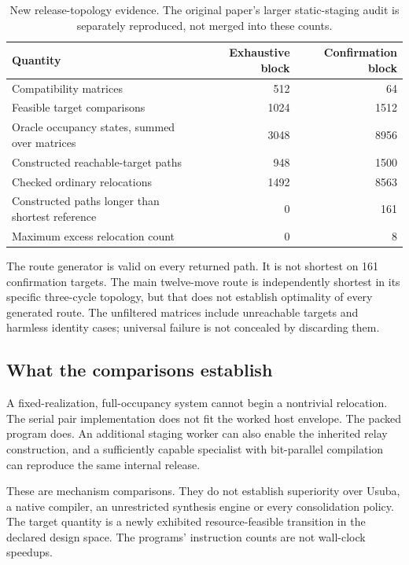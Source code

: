 \documentclass[11pt,letterpaper]{article}
\theoremstyle{definition}\newtheorem{definition}[theorem]{Definition}
\theoremstyle{remark}\newtheorem{remark}[theorem]{Remark}
\begin{document}
\begin{table}[htbp]\centering\small
\caption{New release-topology evidence. The original paper's larger static-staging audit is separately reproduced, not merged into these counts.}
\begin{tabularx}{\linewidth}{@{}Yrr@{}}\toprule
Quantity & Exhaustive block & Confirmation block\\\midrule
Compatibility matrices & 512 & 64\\
Feasible target comparisons & 1024 & 1512\\
Oracle occupancy states, summed over matrices & 3048 & 8956\\
Constructed reachable-target paths & 948 & 1500\\
Checked ordinary relocations & 1492 & 8563\\
Constructed paths longer than shortest reference & 0 & 161\\
Maximum excess relocation count & 0 & 8\\\bottomrule
\end{tabularx}
\label{tab:topology}
\end{table}

The route generator is valid on every returned path. It is not shortest on 161 confirmation targets. The main twelve-move route is independently shortest in its specific three-cycle topology, but that does not establish optimality of every generated route. The unfiltered matrices include unreachable targets and harmless identity cases; universal failure is not concealed by discarding them.

\subsection{What the comparisons establish}
A fixed-realization, full-occupancy system cannot begin a nontrivial relocation. The serial pair implementation does not fit the worked host envelope. The packed program does. An additional staging worker can also enable the inherited relay construction, and a sufficiently capable specialist with bit-parallel compilation can reproduce the same internal release.

These are mechanism comparisons. They do not establish superiority over Usuba, a native compiler, an unrestricted synthesis engine or every consolidation policy. The target quantity is a newly exhibited resource-feasible transition in the declared design space. The programs' instruction counts are not wall-clock speedups.
\end{document}
